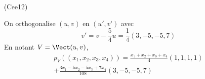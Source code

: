 \begin{tiny}(Cee12)\end{tiny} On orthogonalise $(u,v)$ en $(u',v')$ avec
\begin{displaymath}
 v' =
 v - \frac{5}{4}u 
 = \frac{1}{4}(3, -5, -5, 7)
\end{displaymath}
En notant $V=\Vect(u,v)$,
\begin{multline*}
p_V((x_1,x_2,x_3,x_4))
=
\frac{x_1+x_2+x_3+x_4}{4}(1,1,1,1)\\ 
+
\frac{3x_1-5x_2-5x_3+7x_4}{108}(3,-5,-5,7)
\end{multline*}
